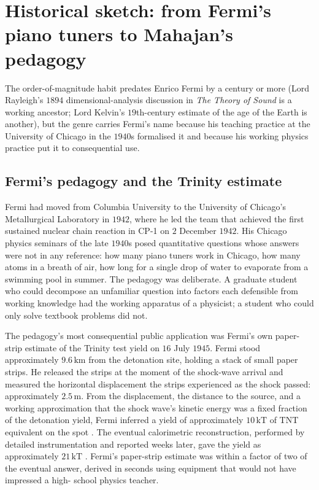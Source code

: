 \section{Historical sketch: from Fermi's piano tuners to
Mahajan's pedagogy}

The order-of-magnitude habit predates Enrico Fermi by a
century or more (Lord Rayleigh's $1894$ dimensional-analysis
discussion in \emph{The Theory of Sound} is a working
ancestor; Lord Kelvin's $19$th-century estimate of the age of
the Earth is another), but the genre carries Fermi's name
because his teaching practice at the University of Chicago in
the $1940$s formalised it and because his working physics
practice put it to consequential use.

\subsection{Fermi's pedagogy and the Trinity estimate}

Fermi had moved from Columbia University to the University of
Chicago's Metallurgical Laboratory in $1942$, where he led the
team that achieved the first sustained nuclear chain reaction
in CP-1 on $2$ December $1942$. His Chicago physics seminars
of the late $1940$s posed quantitative questions whose answers
were not in any reference: how many piano tuners work in
Chicago, how many atoms in a breath of air, how long for a
single drop of water to evaporate from a swimming pool in
summer. The pedagogy was deliberate. A graduate student who
could decompose an unfamiliar question into factors each
defensible from working knowledge had the working apparatus
of a physicist; a student who could only solve textbook
problems did not.

The pedagogy's most consequential public application was
Fermi's own paper-strip estimate of the Trinity test yield on
$16$ July $1945$. Fermi stood approximately $9.6 \,\si{\kilo
\meter}$ from the detonation site, holding a stack of small
paper strips. He released the strips at the moment of the
shock-wave arrival and measured the horizontal displacement
the strips experienced as the shock passed: approximately $2.5
\,\si{\meter}$. From the displacement, the distance to the
source, and a working approximation that the shock wave's
kinetic energy was a fixed fraction of the detonation yield,
Fermi inferred a yield of approximately $10 \,\text{kT}$ of
TNT equivalent on the spot \cite{hist:ch09t3-fermi-trinity}.
The eventual calorimetric reconstruction, performed by
detailed instrumentation and reported weeks later, gave the
yield as approximately $21 \,\text{kT}$
\cite{hist:ch09t3-rhodes-1986}. Fermi's paper-strip estimate
was within a factor of two of the eventual answer, derived in
seconds using equipment that would not have impressed a high-
school physics teacher.

